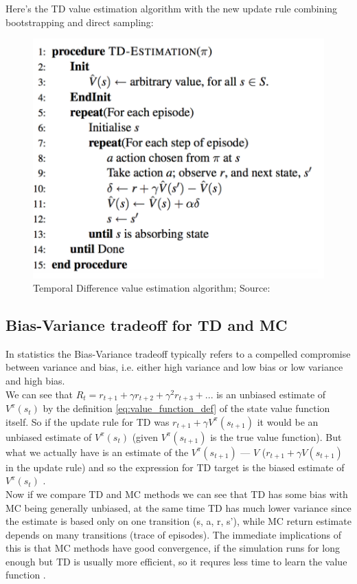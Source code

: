 Here's the TD value estimation algorithm with the new update rule combining bootstrapping and direct sampling:

\begin{figure}[h!]
  \centering
  \includegraphics[scale=0.6]{figures/TD_value_estimation.PNG}
  \caption{Temporal Difference value estimation algorithm; Source: \cite{lecture_mfl}}
  \label{fig:td}
\end{figure}

\subsection{Bias-Variance tradeoff for TD and MC}
In statistics the Bias-Variance tradeoff typically refers to 
a compelled compromise between variance and bias, i.e. either high variance and low bias or low variance and high bias. \\

We can see that $R_t = r_{t+1} + \gamma r_{t+2} + \gamma ^2 r_{t+3} + ...$ is an unbiased estimate of $V^{\pi} (s_t)$ by the definition \ref{eq:value_function_def} of the state value function itself. So if the update rule for TD was $r_{t+1} + \gamma V^{\pi}(s_{t+1})$ it would be an unbiased estimate of $V^{\pi}(s_{t})$ (given $V^{\pi}(s_{t+1})$ is the true value function). But what we actually have is an estimate of the $V^{\pi}(s_{t+1})$ — $V$ ($r_{t+1} + \gamma V(s_{t+1})$ in the update rule) and so the expression for TD target is the biased estimate of $V^{\pi}(s_t)$ \cite{lecture_mfl}. \\

Now if we compare TD and MC methods we can see that TD has some bias with MC being generally unbiased, at the same time TD has much lower variance since the estimate is based only on one transition (s, a, r, s'), while MC return estimate depends on many transitions (trace of episodes). The immediate implications of this is that MC methods have good convergence,
if the simulation runs for long enough but TD is usually more efficient, so it requres less time to learn the value function \cite{lecture_mfl}.

